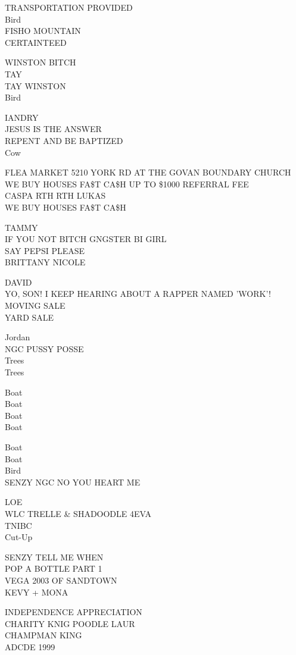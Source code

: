 \documentclass[10pt,letterpaper]{article}
\begin{document}
TRANSPORTATION PROVIDED\\
Bird\\
FISHO MOUNTAIN\\
CERTAINTEED

WINSTON BITCH\\
TAY\\
TAY WINSTON\\
Bird

IANDRY\\
JESUS IS THE ANSWER\\
REPENT AND BE BAPTIZED\\
Cow

FLEA MARKET 5210 YORK RD AT THE GOVAN BOUNDARY CHURCH\\
WE BUY HOUSES FA\$T CA\$H UP TO \$1000 REFERRAL FEE\\
CASPA RTH RTH LUKAS\\
WE BUY HOUSES FA\$T CA\$H

TAMMY\\
IF YOU NOT BITCH GNGSTER BI GIRL\\
SAY PEPSI PLEASE\\
BRITTANY NICOLE

DAVID\\
YO, SON!  I KEEP HEARING ABOUT A RAPPER NAMED 'WORK'!\\
MOVING SALE\\
YARD SALE

Jordan\\
NGC PUSSY POSSE\\
Trees\\
Trees

Boat\\
Boat\\
Boat\\
Boat

Boat\\
Boat\\
Bird\\
SENZY NGC NO YOU HEART ME

LOE\\
WLC TRELLE \& SHADOODLE 4EVA\\
TNIBC\\
Cut{-}Up

SENZY TELL ME WHEN\\
POP A BOTTLE PART 1\\
VEGA 2003 OF SANDTOWN\\
KEVY + MONA

INDEPENDENCE APPRECIATION\\
CHARITY KNIG POODLE LAUR\\
CHAMPMAN KING\\
ADCDE 1999
\end{document}
